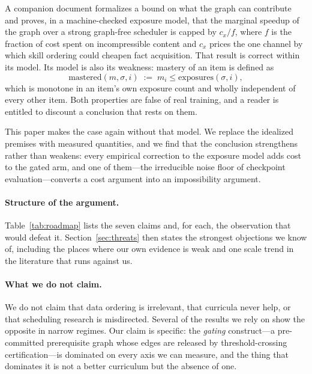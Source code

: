 \documentclass[11pt]{article}
\theoremstyle{plain}
\theoremstyle{definition}
\theoremstyle{remark}
\begin{document}
A companion document formalizes a bound on what the graph can contribute and
proves, in a machine-checked exposure model, that the marginal speedup of the
graph over a strong graph-free scheduler is capped by $c_x/f$, where $f$ is the
fraction of cost spent on incompressible content and $c_x$ prices the one channel
by which skill ordering could cheapen fact acquisition. That result is correct
within its model. Its model is also its weakness: mastery of an item is defined
as
\[
\mathrm{mastered}(m,\sigma,i) \;:=\; m_i \le \mathrm{exposures}(\sigma, i),
\]
which is monotone in an item's own exposure count and wholly independent of every
other item. Both properties are false of real training, and a reader is entitled
to discount a conclusion that rests on them.

This paper makes the case again without that model. We replace the idealized
premises with measured quantities, and we find that the conclusion strengthens
rather than weakens: every empirical correction to the exposure model adds cost
to the gated arm, and one of them---the irreducible noise floor of checkpoint
evaluation---converts a cost argument into an impossibility argument.

\paragraph{Structure of the argument.} Table~\ref{tab:roadmap} lists the seven
claims and, for each, the observation that would defeat it.
Section~\ref{sec:threats} then states the strongest objections we know of,
including the places where our own evidence is weak and one scale trend in the
literature that runs against us.

\paragraph{What we do not claim.} We do not claim that data ordering is
irrelevant, that curricula never help, or that scheduling research is
misdirected. Several of the results we rely on show the opposite in narrow
regimes. Our claim is specific: the \emph{gating} construct---a pre-committed
prerequisite graph whose edges are released by threshold-crossing
certification---is dominated on every axis we can measure, and the thing that
dominates it is not a better curriculum but the absence of one.
\end{document}
